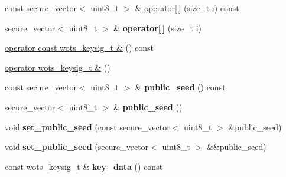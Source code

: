 \begin{DoxyCompactItemize}
\item 
const secure\+\_\+vector$<$ uint8\+\_\+t $>$ \& \hyperlink{class_botan_1_1_x_m_s_s___w_o_t_s___public_key_ae4e237a93bd043f4b34e02c03bfa1559}{operator\mbox{[}$\,$\mbox{]}} (size\+\_\+t i) const
\item 
\mbox{\label{class_botan_1_1_x_m_s_s___w_o_t_s___public_key_a6182be51cb89f842beee52781b39c624}} 
secure\+\_\+vector$<$ uint8\+\_\+t $>$ \& {\bfseries operator\mbox{[}$\,$\mbox{]}} (size\+\_\+t i)
\item 
\hyperlink{class_botan_1_1_x_m_s_s___w_o_t_s___public_key_a2fb35383de7e366cfa3033609ced1f57}{operator const wots\+\_\+keysig\+\_\+t \&} () const
\item 
\hyperlink{class_botan_1_1_x_m_s_s___w_o_t_s___public_key_a086c1c4b5e5eb289a56a972e17124863}{operator wots\+\_\+keysig\+\_\+t \&} ()
\item 
\mbox{\label{class_botan_1_1_x_m_s_s___w_o_t_s___public_key_af2047e200c02832dab036ef51da076c6}} 
const secure\+\_\+vector$<$ uint8\+\_\+t $>$ \& {\bfseries public\+\_\+seed} () const
\item 
\mbox{\label{class_botan_1_1_x_m_s_s___w_o_t_s___public_key_a74f242bbcf675a4d2f5507cb44c89a96}} 
secure\+\_\+vector$<$ uint8\+\_\+t $>$ \& {\bfseries public\+\_\+seed} ()
\item 
\mbox{\label{class_botan_1_1_x_m_s_s___w_o_t_s___public_key_aa5c05f34ee40b753ff5f37eade68bf69}} 
void {\bfseries set\+\_\+public\+\_\+seed} (const secure\+\_\+vector$<$ uint8\+\_\+t $>$ \&public\+\_\+seed)
\item 
\mbox{\label{class_botan_1_1_x_m_s_s___w_o_t_s___public_key_a991b1b9045643b610f7a23d22bc83c95}} 
void {\bfseries set\+\_\+public\+\_\+seed} (secure\+\_\+vector$<$ uint8\+\_\+t $>$ \&\&public\+\_\+seed)
\item 
\mbox{\label{class_botan_1_1_x_m_s_s___w_o_t_s___public_key_a70b4ae300ac80392f20eafbf11d1515c}} 
const wots\+\_\+keysig\+\_\+t \& {\bfseries key\+\_\+data} () const
\item 

\end{DoxyCompactItemize}

